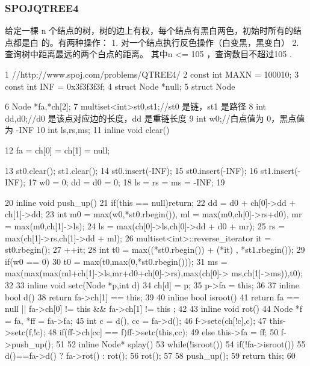 \documentclass[11pt]{article}
\begin{document}
\subsubsection{SPOJQTREE4}

\begin{Code}
     给定一棵 n 个结点的树，树的边上有权，每个结点有黑白两色，初始时所有的结点都是白
     的。有两种操作：
     1. 对一个结点执行反色操作（白变黑，黑变白）
     2. 查询树中距离最远的两个白点的距离。
     其中n <= 105 ，查询数目不超过105 .

 1   //http://www.spoj.com/problems/QTREE4/
 2   const int MAXN = 100010;
 3   const int INF = 0x3f3f3f3f;
 4   struct Node *null;
 5   struct Node{
 6       Node *fa,*ch[2];
 7       multiset<int>st0,st1;//st0 是链，st1 是路径
 8       int dd,d0;//d0 是该点对应边的长度，dd 是重链长度
 9       int w0;//白点值为 0，黑点值为 -INF
10       int ls,rs,ms;
11       inline void clear(){
12           fa = ch[0] = ch[1] = null;


13              st0.clear(); st1.clear();
14              st0.insert(-INF);
15              st0.insert(-INF);
16              st1.insert(-INF);
17              w0 = 0; dd = d0 = 0;
18              ls = rs = ms = -INF;
19       }
20       inline void push_up(){
21           if(this == null)return;
22           dd = d0 + ch[0]->dd + ch[1]->dd;
23           int m0 = max(w0,*st0.rbegin()), ml = max(m0,ch[0]->rs+d0),
                mr = max(m0,ch[1]->ls);
24           ls = max(ch[0]->ls,ch[0]->dd + d0 + mr);
25           rs = max(ch[1]->rs,ch[1]->dd + ml);
26           multiset<int>::reverse_iterator it = st0.rbegin();
27           ++it;
28           int t0 = max((*st0.rbegin()) + (*it) , *st1.rbegin());
29           if(w0 == 0)
30                t0 = max(t0,max(0,*st0.rbegin()));
31           ms = max(max(max(ml+ch[1]->ls,mr+d0+ch[0]->rs),max(ch[0]->
                ms,ch[1]->ms)),t0);
32       }
33       inline void setc(Node *p,int d){
34           ch[d] = p;
35           p->fa = this;
36       }
37       inline bool d(){
38           return fa->ch[1] == this;
39       }
40       inline bool isroot(){
41           return fa == null || fa->ch[0] != this && fa->ch[1] != this
                ;
42       }
43       inline void rot(){
44           Node *f = fa, *ff = fa->fa;
45           int c = d(), cc = fa->d();
46           f->setc(ch[!c],c);
47           this->setc(f,!c);
48           if(ff->ch[cc] == f)ff->setc(this,cc);
49           else this->fa = ff;
50           f->push_up();
51       }
52       inline Node* splay(){
53           while(!isroot()){
54                if(!fa->isroot())
55                    d()==fa->d() ? fa->rot() : rot();
56                rot();
57           }
58           push_up();
59           return this;
60       }


}
\end{Code}
\end{document}
